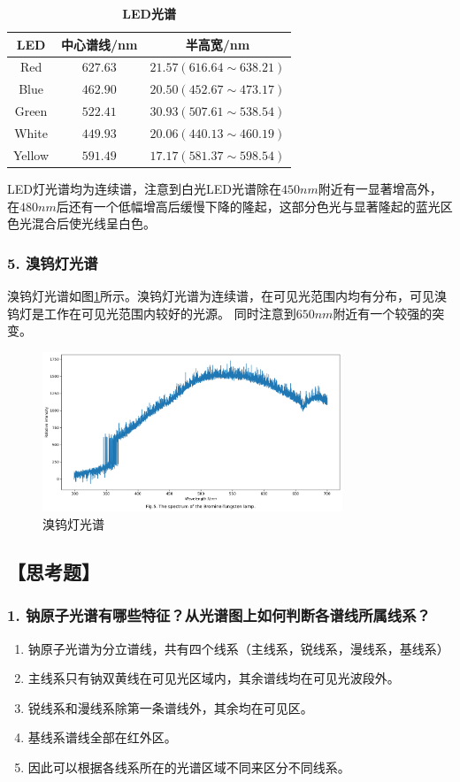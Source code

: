 \documentclass[12pt,a4paper,UTF8]{ctexart}
\begin{document}
\begin{table}[htbp]
	\centering
	\begin{tabular}{ccc}
	\toprule
	LED &中心谱线/nm &半高宽/nm \\
	\midrule
	Red &$627.63$ &$21.57(616.64\sim 638.21)$ \\
	Blue &$462.90$ &$20.50(452.67\sim 473.17)$ \\
	Green &$522.41$ &$30.93(507.61\sim 538.54)$ \\
	White &$449.93$ &$20.06(440.13\sim 460.19)$ \\
	Yellow &$591.49$ &$17.17(581.37\sim 598.54)$ \\
	\bottomrule
    \end{tabular}
    \caption{\textbf{LED光谱}}
	\label{tab:4}
\end{table}

LED灯光谱均为连续谱，注意到白光LED光谱除在$450nm$附近有一显著增高外，在$480nm$后还有一个低幅增高后缓慢下降的隆起，这部分色光与显著隆起的蓝光区色光混合后使光线呈白色。

\subsubsection*{5. 溴钨灯光谱}
溴钨灯光谱如图\ref{fig:5}所示。溴钨灯光谱为连续谱，在可见光范围内均有分布，可见溴钨灯是工作在可见光范围内较好的光源。
同时注意到$650nm$附近有一个较强的突变。

\begin{figure}[htbp]
	\centering
	\includegraphics[width=0.8\textwidth]{attachments//Fig.5.png}
	\caption{溴钨灯光谱}
	\label{fig:5}
\end{figure}

\subsection*{【思考题】}
\subsubsection*{1. 钠原子光谱有哪些特征？从光谱图上如何判断各谱线所属线系？}
\begin{enumerate}[label=\arabic*.]
	\item 钠原子光谱为分立谱线，共有四个线系（主线系，锐线系，漫线系，基线系）
	\item 主线系只有钠双黄线在可见光区域内，其余谱线均在可见光波段外。
	\item 锐线系和漫线系除第一条谱线外，其余均在可见区。
	\item 基线系谱线全部在红外区。
	\item 因此可以根据各线系所在的光谱区域不同来区分不同线系。
\end{enumerate}
\end{document}
